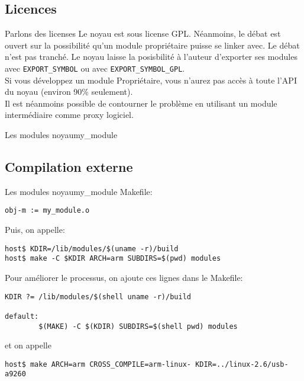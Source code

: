 \subsection{Licences}

\begin{frame}[fragile=singleslide]{Parlons des licenses}
  Le noyau est sous license GPL. Néanmoins, le débat est ouvert sur la
  possibilité  qu'un module  propriétaire puisse  se linker  avec.  Le
  débat n'est pas  tranché. Le noyau laisse la  posisbilité à l'auteur
  d'exporter   ses   modules   avec   \verb+EXPORT_SYMBOL+   ou   avec
  \verb+EXPORT_SYMBOL_GPL+.
\\[2ex]
  Si vous développez un module Propriétaire, vous n'aurez pas accès à
  toute l'API du noyau (environ 90\% seulement).
\\[2ex]
  Il est néanmoins possible de contourner le problème en utilisant un
  module intermédiaire comme proxy logiciel.
\end{frame}

\begin{frame}[fragile=singleslide]{Les modules noyau}{my\_module}
  
\end{frame}

\subsection{Compilation externe}

\begin{frame}[fragile=singleslide]{Les modules noyau}{my\_module}
  Makefile:
  \begin{lstlisting}
obj-m := my_module.o
  \end{lstlisting}
  Puis, on appelle:
  \begin{lstlisting}
host$ KDIR=/lib/modules/$(uname -r)/build
host$ make -C $KDIR ARCH=arm SUBDIRS=$(pwd) modules
  \end{lstlisting} %
  Pour améliorer le processus, on ajoute ces lignes dans le Makefile:
  \begin{lstlisting}
KDIR ?= /lib/modules/$(shell uname -r)/build

default:
        $(MAKE) -C $(KDIR) SUBDIRS=$(shell pwd) modules
  \end{lstlisting}
  et on appelle
  \begin{lstlisting}
host$ make ARCH=arm CROSS_COMPILE=arm-linux- KDIR=../linux-2.6/usb-a9260
  \end{lstlisting} %
\end{frame}

